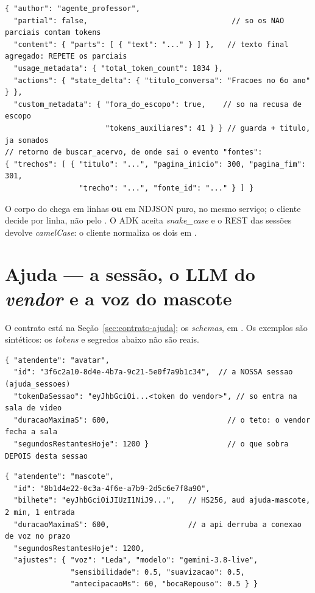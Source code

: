 \begin{lstlisting}[language=jsonunoo, caption={Um evento do ADK no \emph{stream} (abreviado), e o que a api lê dele}]
{ "author": "agente_professor",
  "partial": false,                                 // so os NAO parciais contam tokens
  "content": { "parts": [ { "text": "..." } ] },   // texto final agregado: REPETE os parciais
  "usage_metadata": { "total_token_count": 1834 },
  "actions": { "state_delta": { "titulo_conversa": "Fracoes no 6o ano" } },
  "custom_metadata": { "fora_do_escopo": true,    // so na recusa de escopo
                       "tokens_auxiliares": 41 } } // guarda + titulo, ja somados
// retorno de buscar_acervo, de onde sai o evento "fontes":
{ "trechos": [ { "titulo": "...", "pagina_inicio": 300, "pagina_fim": 301,
                 "trecho": "...", "fonte_id": "..." } ] }
\end{lstlisting}

\begin{nota}
O corpo do  chega em linhas  \textbf{ou} em
NDJSON puro, no mesmo serviço; o cliente decide por linha, não pelo
. O ADK aceita \emph{snake\_case} e o REST das sessões devolve
\emph{camelCase}: o cliente normaliza os dois em .
\end{nota}

\section{Ajuda --- a sessão, o LLM do \emph{vendor} e a voz do mascote}
\label{sec:payload-ajuda}

O contrato está na Seção~\ref{sec:contrato-ajuda}; os \emph{schemas}, em
. Os exemplos são sintéticos: os
\emph{tokens} e segredos abaixo não são reais.

\begin{lstlisting}[language=jsonunoo, caption={\rota{POST /ajuda/sessoes} --- 201, avatar (corpo opcional \cd{\{ "atendente": "avatar" \}})}]
{ "atendente": "avatar",
  "id": "3f6c2a10-8d4e-4b7a-9c21-5e0f7a9b1c34",  // a NOSSA sessao (ajuda_sessoes)
  "tokenDaSessao": "eyJhbGciOi...<token do vendor>", // so entra na sala de video
  "duracaoMaximaS": 600,                           // o teto: o vendor fecha a sala
  "segundosRestantesHoje": 1200 }                  // o que sobra DEPOIS desta sessao
\end{lstlisting}

\begin{lstlisting}[language=jsonunoo, caption={\rota{POST /ajuda/sessoes} --- 201, mascote (\adrr{ADR-158})}]
{ "atendente": "mascote",
  "id": "8b1d4e22-0c3a-4f6e-a7b9-2d5c6e7f8a90",
  "bilhete": "eyJhbGciOiJIUzI1NiJ9...",   // HS256, aud ajuda-mascote, 2 min, 1 entrada
  "duracaoMaximaS": 600,                  // a api derruba a conexao de voz no prazo
  "segundosRestantesHoje": 1200,
  "ajustes": { "voz": "Leda", "modelo": "gemini-3.8-live",
               "sensibilidade": 0.5, "suavizacao": 0.5,
               "antecipacaoMs": 60, "bocaRepouso": 0.5 } }
\end{lstlisting}

